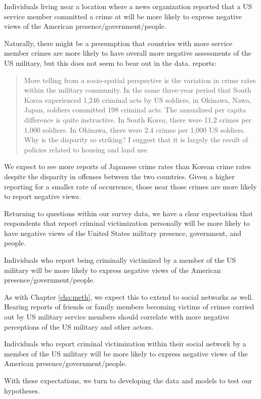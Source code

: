 \begin{hyp}
	Individuals living near a location where a news organization reported that a US service member committed a crime at will be more likely to express negative views of the American presence/government/people.  %
\end{hyp}

Naturally, there might be a presumption that countries with more service member crimes are more likely to have overall more negative assessments of the US military, but this does not seem to bear out in the data.  reports: 

\begin{quote}
	More telling from a socio-spatial perspective is the variation in crime rates within the military community. In the same three-year period that South Korea experienced 1,246 criminal acts by US soldiers, in Okinawa, Nawa, Japan, soldiers committed 198 criminal acts. The annualized per capita difference is quite instructive. In South Korea, there were 11.2 crimes per 1,000 soldiers. In Okinawa, there were 2.4 crimes per 1,000 US soldiers. Why is the disparity so striking? I suggest that it is largely the result of policies related to housing and land use.
\end{quote}

We expect to see more reports of Japanese crime rates than Korean crime rates despite the disparity in offenses between the two countries. Given a higher reporting for a smaller rate of occurrence, those near those crimes are more likely to report negative views.

Returning to questions within our survey data, we have a clear expectation that respondents that report criminal victimization personally will be more likely to have negative views of the United States military presence, government, and people. 

\begin{hyp}
	Individuals who report being criminally victimized by a member of the US military will be more likely to express negative views of the American presence/government/people. 
\end{hyp}

As with Chapter \ref{cha:meth}, we expect this to extend to social networks as well. Hearing reports of friends or family members becoming victims of crimes carried out by US military service members should correlate with more negative perceptions of the US military and other actors. 

\begin{hyp}
	Individuals who report criminal victimization within their social network by a member of the US military will be more likely to express negative views of the American presence/government/people. 
\end{hyp}

With these expectations, we turn to developing the data and models to test our hypotheses.


